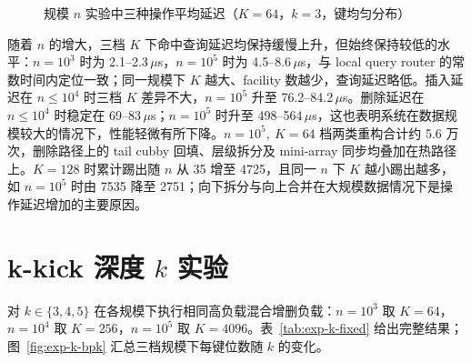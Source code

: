 \begin{figure}[htbp]
  \centering
  \caption{规模 $n$ 实验中三种操作平均延迟（$K=64$，$k=3$，键均匀分布）}
  \label{fig:exp-n-latency}
\end{figure}

随着 \(n\) 的增大，三档 \(K\) 下命中查询延迟均保持缓慢上升，但始终保持较低的水平：\(n=10^3\) 时为 2.1--2.3\,$\mu$s，\(n=10^5\) 时为 4.5--8.6\,$\mu$s，与 local query router 的常数时间内定位一致\cite{bender2022otsh,morrison1968}；同一规模下 \(K\) 越大、facility 数越少，查询延迟略低。插入延迟在 \(n\le 10^4\) 时三档 \(K\) 差异不大，\(n=10^5\) 升至 76.2--84.2\,$\mu$s。删除延迟在 \(n\le 10^4\) 时稳定在 69--83\,$\mu$s；\(n=10^5\) 时升至 498--564\,$\mu$s，这也表明系统在数据规模较大的情况下，性能轻微有所下降。\(n = 10 ^5 ,\ K=64\) 档两类重构合计约 5.6 万次，删除路径上的 tail cubby 回填、层级拆分及 mini-array 同步均叠加在热路径上。\(K=128\) 时累计踢出随 \(n\) 从 35 增至 4725，且同一 \(n\) 下 \(K\) 越小踢出越多，如 \(n=10^5\) 时由 7535 降至 2751；向下拆分与向上合并在大规模数据情况下是操作延迟增加的主要原因\cite{bender2024iceberg,pandey2023iceberght}。

\section{k-kick 深度 \texorpdfstring{$k$}{k} 实验}

对 \(k\in\{3,4,5\}\) 在各规模下执行相同高负载混合增删负载：\(n=10^3\) 取 \(K=64\)，\(n=10^4\) 取 \(K=256\)，\(n=10^5\) 取 \(K=4096\)。表~\ref{tab:exp-k-fixed} 给出完整结果；图~\ref{fig:exp-k-bpk} 汇总三档规模下每键位数随 \(k\) 的变化。


